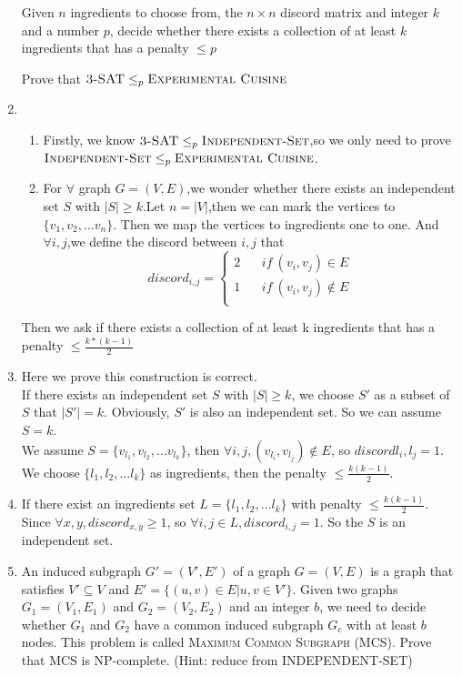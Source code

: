 \documentclass[12pt,a4paper]{article}
\makeatletter
\newtheorem*{solution}{Solution}
\theoremstyle{definition}
\renewenvironment{solution}[1][Solution] {\par\pushQED{\qed}\normalfont\topsep6\p@\@plus6\p@\relax\trivlist\item[\hskip\labelsep\bfseries#1\@addpunct{.}]\ignorespaces}{\popQED\endtrivlist\@endpefalse} \makeatother
\makeatother
\begin{document}
\begin{enumerate}
        Given $n$ ingredients to choose from, the $n\times n$ discord matrix and integer $k$ and a number $p$,  decide whether there exists a collection of at least $k$ ingredients that has a penalty $\leqslant p$

    Prove that $\textsc{3-SAT}\leq_p\textsc{Experimental Cuisine}$
    \begin{solution}
    \begin{enumerate}
        \item Firstly, we know $\textsc{3-SAT}\leq_p\textsc{Independent-Set}$,so we only need to prove $\textsc{Independent-Set}\leq_p\textsc{Experimental Cuisine}$.
        \item For $\forall$ graph $G=(V,E)$,we wonder whether there exists an independent set $S$ with $|S|\ge k$.Let $n=|V|$,then we can mark the vertices to $\{v_1,v_2,\dots v_n\}$. Then we map the vertices to ingredients one to one. And $\forall i,j$,we define the discord between $i,j$ that 
        \begin{equation}
            discord_{i,j}=\left\{
        \begin{aligned}
        2 ~~&~~if~(v_i,v_j)\in E \\
        1~~ &~~if~(v_i,v_j)\notin E \\
        \end{aligned}
        \right.
        \end{equation}
    \end{enumerate}
    Then we ask if there exists a collection of at least k ingredients that has a penalty $\le \frac{k*(k-1)}{2}$
    \item Here we prove this construction is correct.\\
    If there exists an independent set $S$ with $|S|\ge k$, we choose $S'$ as a subset of $S$ that $|S'|=k$. Obviously, $S'$ is also an independent set. So we can assume $S=k$.\\
    We assume $S=\{v_{l_1},v_{l_2},\dots v_{l_k}\}$, then $\forall i,j,(v_{l_i},v_{l_j})\notin E$, so $discord{l_i,l_j}=1$. We choose $\{l_1,l_2,\dots l_k\}$ as ingredients, then the penalty $\le \frac{k(k-1)}{2}$.
    \item If there exist an ingredients set $L=\{l_1,l_2,\dots l_k\}$ with penalty $\le \frac{k(k-1)}{2}$. Since $\forall x,y,discord_{x,y}\ge 1$, so $\forall i,j\in L,discord_{i,j}=1$. So the $S$ is an independent set.
    \end{solution}
    \item An induced subgraph $G'=(V',E')$ of a graph $G=(V,E)$ is a graph that satisfies $V'\subseteq V$ and $E' =\{(u,v)\in E| u,v\in V'\}$. Given two graphs $G_1=(V_1,E_1)$ and $G_2=(V_2,E_2)$ and an integer $b$, we need to decide whether $G_1$ and $G_2$ have a common induced subgraph $G_c$ with at least $b$ nodes. This problem is called \textsc{Maximum Common Subgraph} (MCS). Prove that MCS is NP-complete. (Hint: reduce from \textsc{INDEPENDENT-SET})

\end{enumerate}
\end{document}
